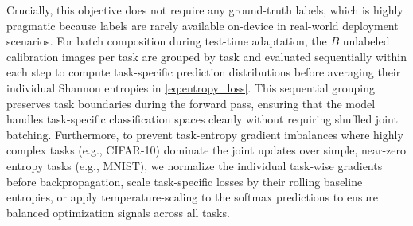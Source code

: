 Crucially, this objective does not require any ground-truth labels, which is highly pragmatic because labels are rarely available on-device in real-world deployment scenarios. For batch composition during test-time adaptation, the $B$ unlabeled calibration images per task are grouped by task and evaluated sequentially within each step to compute task-specific prediction distributions before averaging their individual Shannon entropies in \eqref{eq:entropy_loss}. This sequential grouping preserves task boundaries during the forward pass, ensuring that the model handles task-specific classification spaces cleanly without requiring shuffled joint batching. Furthermore, to prevent task-entropy gradient imbalances where highly complex tasks (e.g., CIFAR-10) dominate the joint updates over simple, near-zero entropy tasks (e.g., MNIST), we normalize the individual task-wise gradients before backpropagation, scale task-specific losses by their rolling baseline entropies, or apply temperature-scaling to the softmax predictions to ensure balanced optimization signals across all tasks.

